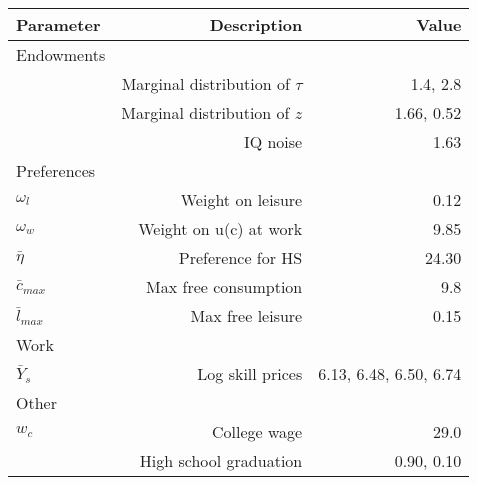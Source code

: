\begin{tabular}{lrr}
\hline
Parameter & Description  & Value  \\ 
\hline
Endowments &   &   \\ 
 & Marginal distribution of $\tau$  & 1.4, 2.8  \\ 
 & Marginal distribution of $z$  & 1.66, 0.52  \\ 
 & IQ noise  & 1.63  \\ 
Preferences &   &   \\ 
$\omega_{l}$ & Weight on leisure  & 0.12  \\ 
$\omega_{w}$ & Weight on u(c) at work  & 9.85  \\ 
$\bar{\eta}$ & Preference for HS  & 24.30  \\ 
$\bar{c}_{max}$ & Max free consumption  & 9.8  \\ 
$\bar{l}_{max}$ & Max free leisure  & 0.15  \\ 
Work &   &   \\ 
$\bar{Y}_{s}$ & Log skill prices  & 6.13, 6.48, 6.50, 6.74  \\ 
Other &   &   \\ 
$w_{c}$ & College wage  & 29.0  \\ 
 & High school graduation  & 0.90, 0.10  \\ 
\hline
\end{tabular}%
